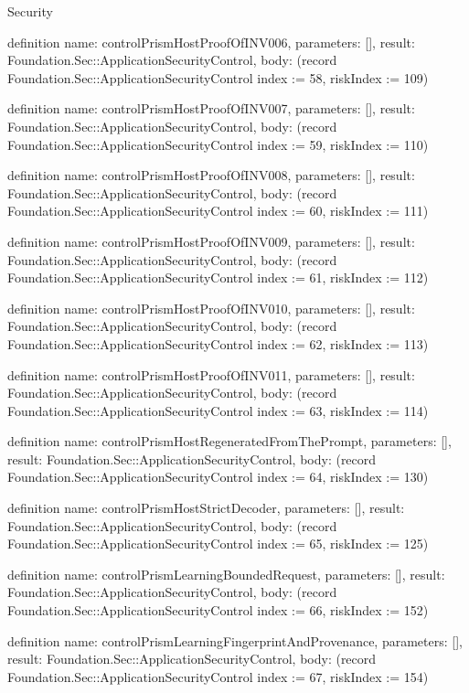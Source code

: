 \begin{lexlean}{Security}
\begin{semanticmodule}
definition{
  name: controlPrismHostProofOfINV006,
  parameters: [],
  result: Foundation.Sec::ApplicationSecurityControl,
  body: (record Foundation.Sec::ApplicationSecurityControl {index := 58, riskIndex := 109})
}

definition{
  name: controlPrismHostProofOfINV007,
  parameters: [],
  result: Foundation.Sec::ApplicationSecurityControl,
  body: (record Foundation.Sec::ApplicationSecurityControl {index := 59, riskIndex := 110})
}

definition{
  name: controlPrismHostProofOfINV008,
  parameters: [],
  result: Foundation.Sec::ApplicationSecurityControl,
  body: (record Foundation.Sec::ApplicationSecurityControl {index := 60, riskIndex := 111})
}

definition{
  name: controlPrismHostProofOfINV009,
  parameters: [],
  result: Foundation.Sec::ApplicationSecurityControl,
  body: (record Foundation.Sec::ApplicationSecurityControl {index := 61, riskIndex := 112})
}

definition{
  name: controlPrismHostProofOfINV010,
  parameters: [],
  result: Foundation.Sec::ApplicationSecurityControl,
  body: (record Foundation.Sec::ApplicationSecurityControl {index := 62, riskIndex := 113})
}

definition{
  name: controlPrismHostProofOfINV011,
  parameters: [],
  result: Foundation.Sec::ApplicationSecurityControl,
  body: (record Foundation.Sec::ApplicationSecurityControl {index := 63, riskIndex := 114})
}

definition{
  name: controlPrismHostRegeneratedFromThePrompt,
  parameters: [],
  result: Foundation.Sec::ApplicationSecurityControl,
  body: (record Foundation.Sec::ApplicationSecurityControl {index := 64, riskIndex := 130})
}

definition{
  name: controlPrismHostStrictDecoder,
  parameters: [],
  result: Foundation.Sec::ApplicationSecurityControl,
  body: (record Foundation.Sec::ApplicationSecurityControl {index := 65, riskIndex := 125})
}

definition{
  name: controlPrismLearningBoundedRequest,
  parameters: [],
  result: Foundation.Sec::ApplicationSecurityControl,
  body: (record Foundation.Sec::ApplicationSecurityControl {index := 66, riskIndex := 152})
}

definition{
  name: controlPrismLearningFingerprintAndProvenance,
  parameters: [],
  result: Foundation.Sec::ApplicationSecurityControl,
  body: (record Foundation.Sec::ApplicationSecurityControl {index := 67, riskIndex := 154})
}


\end{semanticmodule}
\end{lexlean}
